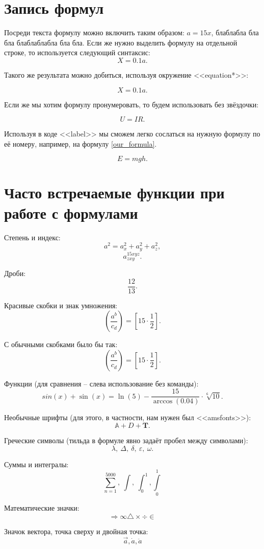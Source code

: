 \documentclass[a4paper, 12pt]{article}
\begin{document}
\section{Запись формул}
Посреди текста формулу можно включить таким образом: $a = 15x$, блаблабла бла бла блаблаблабла бла бла. Если же нужно выделить формулу на отдельной строке, то используется следующий синтаксис:
\[ X = 0.1 a. \]

Такого же результата можно добиться, используя окружение <<equation*>>:

\begin{equation*}
X = 0.1 a.
\end{equation*}

Если же мы хотим формулу пронумеровать, то будем использовать без звёздочки:

\begin{equation}
U = IR.
\end{equation}

Используя в коде <<label>> мы сможем легко сослаться на нужную формулу по её номеру, например, на формулу \eqref{our_formula}.

\begin{equation}\label{our_formula}
E = mgh.
\end{equation}

\section{Часто встречаемые функции при работе с формулами}
Степень и индекс:
\[ a^2 = a_x^2 + a^2_y + a_z^2, \]
\[ a^{15xyz}_{zxy} .\]

Дроби:
\[ \frac{12}{13}. \]

Красивые скобки и знак умножения:
\[ \left( \frac{a^b}{c_d} \right) = \left[ 15 \cdot \frac{1}{2} \right]. \]

С обычными скобками было бы так:
\[ ( \frac{a^b}{c_d} ) = [ 15 \cdot \frac{1}{2} ].  \]

Функции (для сравнения -- слева использование без команды):
\[ sin(x) + \sin(x) = \ln(5) - \frac{15}{\arccos(0.04)} \cdot \sqrt[6]{10}. \]

Необычные шрифты (для этого, в частности, нам нужен был <<amsfonts>>):
\[ \mathbb{A} + \mathit{D} + \mathbf{T}. \]

Греческие символы (тильда в формуле явно задаёт пробел между символами):
\[ \lambda,~\Delta,~\delta,~\varepsilon,~\omega. \]

Суммы и интегралы:
\[ \sum^{5000}_{n = 1},~ \int,~ \int^1_0, \int\limits^1_0\]

Математические значки:
\[ \Rightarrow \infty \triangle \times \div \in \]


Значок вектора, точка сверху и двойная точка:
\[ \vec{a}, \dot{a}, \ddot{a} \]
\end{document}
